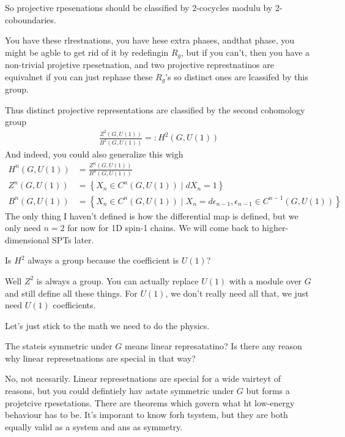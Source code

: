 So projective rpesenations should be classified by 2-cocycles modulu by
2-coboundaries.

You have these rlrestnations,
you have hese extra phases,
andthat phase,
you might be agble to get rid of it by redefingin $R_g$,
but if you can't,
then you have a non-trivial projetive rpesetnation,
and two projective represtnatinos are equivalnet if you can just rephase these
$R_g$'s so distinct ones are lcassifed by this group.

Thus distinct projective representations are classified by
the second cohomology group
\begin{align}
    \frac{Z^2(G, U(1))}{B^2(G, U(1))} =:
    H^2(G, U(1))
\end{align}
And indeed,
you could also generalize this wigh
\begin{align}
    H^n (G, U(1)) &=
    \frac{Z^n(G, U(1))}{B^n(G, U(1))}\\
    Z^n(G, U(1)) &=
    \left\{ X_n \in C^n(G, U(1)) \mid dX_n = 1 \right\}\\
    B^n\left( G, U(1) \right)
    &=
    \left\{ 
    X_n \in C^n(G, U(1)) \mid
    X_n = d\epsilon_{n-1},
    \epsilon_{n-1} \in C^{n-1}(G, U(1))
    \right\}
\end{align}
The only thing I haven't defined is how the differential map is defined,
but we only need $n=2$ for now for 1D spin-1 chains.
We will come back to higher-dimensional SPTs later.

\begin{question}
    Is $H^2$ always a group because the coefficient is $U(1)$?
\end{question}
Well $Z^2$ is always a group.
You can actually replace $U(1)$ with a module over $G$ and still define all
these things.
For $U(1)$,
we don't really need all that,
we just need $U(1)$ coefficients.

Let's just stick to the math we need to do the physics.


\begin{question}
    The stateis symmetric under $G$ means linear represatatino?
    Is there any reason why linear represetnations are special in that way?
\end{question}
No, not ncesarily.
Linear represetnations are special for a wide vairteyt of reasons,
but you could defintiely hav astate symmetric under $G$ but forms a projetcive
rpesetations.
There are theorems which govern what ht low-energy behaviour has to be.
It's imporant to know forh tsystem,
but they are both equally valid as a system and ans as symmetry.


